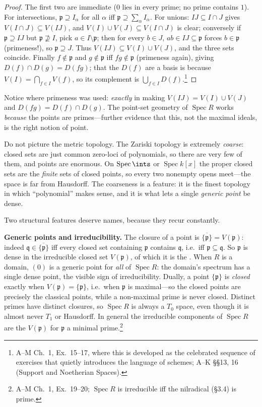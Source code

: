 \documentclass[11pt]{article}
\DeclareMathOperator{\Spec}{Spec}
\newcommand{\mfp}{\mathfrak{p}}
\newcommand{\mfq}{\mathfrak{q}}
\begin{document}
\begin{proof}
The first two are immediate ($0$ lies in every prime; no prime contains $1$). For
intersections, $\mfp\supseteq I_\alpha$ for all $\alpha$ iff $\mfp\supseteq\sum_\alpha
I_\alpha$. For unions: $IJ\subseteq I\cap J$ gives $V(I\cap J)\subseteq V(IJ)$, and
$V(I)\cup V(J)\subseteq V(I\cap J)$ is clear; conversely if $\mfp\supseteq IJ$ but
$\mfp\not\supseteq I$, pick $a\in I\setminus\mfp$; then for every $b\in J$, $ab\in IJ\subseteq
\mfp$ forces $b\in\mfp$ (primeness!), so $\mfp\supseteq J$. Thus $V(IJ)\subseteq
V(I)\cup V(J)$, and the three sets coincide. Finally $f\notin\mfp$ and $g\notin\mfp$ iff
$fg\notin\mfp$ (primeness again), giving $D(f)\cap D(g)=D(fg)$; that the $D(f)$ are a basis is
because $V(I)=\bigcap_{f\in I}V(f)$, so its complement is $\bigcup_{f\in I}D(f)$.\footnote{A--M
Ch.~1, Ex.\ 15--17, where this is developed as the celebrated sequence of exercises that
quietly introduces the language of schemes; A--K \S\S13, 16 (Support and Noetherian Spaces).}
\end{proof}

Notice where primeness was used: \emph{exactly} in making $V(IJ)=V(I)\cup V(J)$ and
$D(fg)=D(f)\cap D(g)$. The point-set geometry of $\Spec R$ works \emph{because} the points are
primes---further evidence that this, not the maximal ideals, is the right notion of point.

\begin{iintuition}
Do not picture the metric topology. The Zariski topology is extremely \emph{coarse}: closed
sets are just common zero-loci of polynomials, so there are very few of them, and points are
enormous. On $\Spec\ints$ or $\Spec k[x]$ the proper closed sets are the \emph{finite} sets of
closed points, so every two nonempty opens meet---the space is far from Hausdorff. The
coarseness is a feature: it is the finest topology in which ``polynomial'' makes sense, and it
is what lets a single \emph{generic point} be dense.
\end{iintuition}

Two structural features deserve names, because they recur constantly.

\textbf{Generic points and irreducibility.} The closure of a point is
$\overline{\{\mfp\}}=V(\mfp)$: indeed $\mfq\in\overline{\{\mfp\}}$ iff every closed set
containing $\mfp$ contains $\mfq$, i.e.\ iff $\mfp\subseteq\mfq$. So $\mfp$ is dense in the
irreducible closed set $V(\mfp)$, of which it is the . When $R$ is a
domain, $(0)$ is a generic point for \emph{all} of $\Spec R$: the domain's spectrum has a
single dense point, the visible sign of irreducibility. Dually, a point $\{\mfp\}$ is
\emph{closed} exactly when $V(\mfp)=\{\mfp\}$, i.e.\ when $\mfp$ is maximal---so the closed
points are precisely the classical points, while a non-maximal prime is never closed. Distinct
primes have distinct closures, so $\Spec R$ is always a $T_0$ space, even though it is almost
never $T_1$ or Hausdorff. In general the irreducible components
of $\Spec R$ are the $V(\mfp)$ for $\mfp$ a minimal prime.\footnote{A--M Ch.~1, Ex.\ 19--20;
$\Spec R$ is irreducible iff the nilradical (\S3.4) is prime.}
\end{document}
